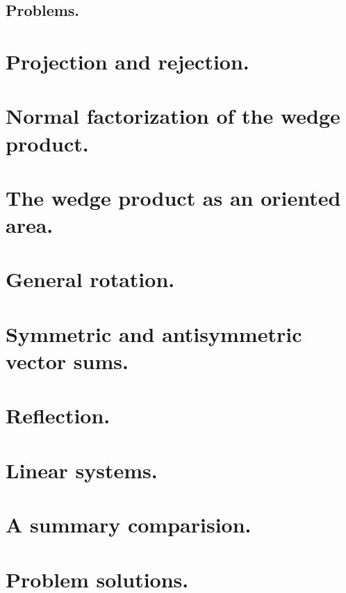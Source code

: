       \subsection{Problems.}
         
         
   \section{Projection and rejection.}
      
   \section{Normal factorization of the wedge product.}
      
   \section{The wedge product as an oriented area.}
      
   \section{General rotation.}
      
   \section{Symmetric and antisymmetric vector sums.}
      
   \section{Reflection.}
      
   \section{Linear systems.}
      
   \section{A summary comparision.}
      
   \section{Problem solutions.}
      \shipoutAnswer
